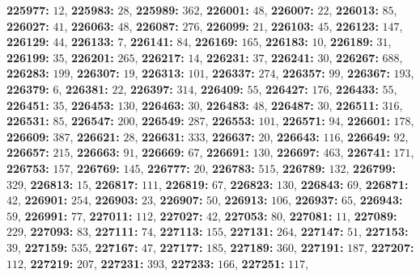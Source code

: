 \textsf{\bfseries 225977:} $12$, \textsf{\bfseries 225983:} $28$, \textsf{\bfseries 225989:} $362$, \textsf{\bfseries 226001:} $48$, \textsf{\bfseries 226007:} $22$, \textsf{\bfseries 226013:} $85$, \textsf{\bfseries 226027:} $41$, \textsf{\bfseries 226063:} $48$, \textsf{\bfseries 226087:} $276$, \textsf{\bfseries 226099:} $21$, \textsf{\bfseries 226103:} $45$, \textsf{\bfseries 226123:} $147$, \textsf{\bfseries 226129:} $44$, \textsf{\bfseries 226133:} $7$, \textsf{\bfseries 226141:} $84$, \textsf{\bfseries 226169:} $165$, \textsf{\bfseries 226183:} $10$, \textsf{\bfseries 226189:} $31$, \textsf{\bfseries 226199:} $35$, \textsf{\bfseries 226201:} $265$, \textsf{\bfseries 226217:} $14$, \textsf{\bfseries 226231:} $37$, \textsf{\bfseries 226241:} $30$, \textsf{\bfseries 226267:} $688$, \textsf{\bfseries 226283:} $199$, \textsf{\bfseries 226307:} $19$, \textsf{\bfseries 226313:} $101$, \textsf{\bfseries 226337:} $274$, \textsf{\bfseries 226357:} $99$, \textsf{\bfseries 226367:} $193$, \textsf{\bfseries 226379:} $6$, \textsf{\bfseries 226381:} $22$, \textsf{\bfseries 226397:} $314$, \textsf{\bfseries 226409:} $55$, \textsf{\bfseries 226427:} $176$, \textsf{\bfseries 226433:} $55$, \textsf{\bfseries 226451:} $35$, \textsf{\bfseries 226453:} $130$, \textsf{\bfseries 226463:} $30$, \textsf{\bfseries 226483:} $48$, \textsf{\bfseries 226487:} $30$, \textsf{\bfseries 226511:} $316$, \textsf{\bfseries 226531:} $85$, \textsf{\bfseries 226547:} $200$, \textsf{\bfseries 226549:} $287$, \textsf{\bfseries 226553:} $101$, \textsf{\bfseries 226571:} $94$, \textsf{\bfseries 226601:} $178$, \textsf{\bfseries 226609:} $387$, \textsf{\bfseries 226621:} $28$, \textsf{\bfseries 226631:} $333$, \textsf{\bfseries 226637:} $20$, \textsf{\bfseries 226643:} $116$, \textsf{\bfseries 226649:} $92$, \textsf{\bfseries 226657:} $215$, \textsf{\bfseries 226663:} $91$, \textsf{\bfseries 226669:} $67$, \textsf{\bfseries 226691:} $130$, \textsf{\bfseries 226697:} $463$, \textsf{\bfseries 226741:} $171$, \textsf{\bfseries 226753:} $157$, \textsf{\bfseries 226769:} $145$, \textsf{\bfseries 226777:} $20$, \textsf{\bfseries 226783:} $515$, \textsf{\bfseries 226789:} $132$, \textsf{\bfseries 226799:} $329$, \textsf{\bfseries 226813:} $15$, \textsf{\bfseries 226817:} $111$, \textsf{\bfseries 226819:} $67$, \textsf{\bfseries 226823:} $130$, \textsf{\bfseries 226843:} $69$, \textsf{\bfseries 226871:} $42$, \textsf{\bfseries 226901:} $254$, \textsf{\bfseries 226903:} $23$, \textsf{\bfseries 226907:} $50$, \textsf{\bfseries 226913:} $106$, \textsf{\bfseries 226937:} $65$, \textsf{\bfseries 226943:} $59$, \textsf{\bfseries 226991:} $77$, \textsf{\bfseries 227011:} $112$, \textsf{\bfseries 227027:} $42$, \textsf{\bfseries 227053:} $80$, \textsf{\bfseries 227081:} $11$, \textsf{\bfseries 227089:} $229$, \textsf{\bfseries 227093:} $83$, \textsf{\bfseries 227111:} $74$, \textsf{\bfseries 227113:} $155$, \textsf{\bfseries 227131:} $264$, \textsf{\bfseries 227147:} $51$, \textsf{\bfseries 227153:} $39$, \textsf{\bfseries 227159:} $535$, \textsf{\bfseries 227167:} $47$, \textsf{\bfseries 227177:} $185$, \textsf{\bfseries 227189:} $360$, \textsf{\bfseries 227191:} $187$, \textsf{\bfseries 227207:} $112$, \textsf{\bfseries 227219:} $207$, \textsf{\bfseries 227231:} $393$, \textsf{\bfseries 227233:} $166$, \textsf{\bfseries 227251:} $117$, 
